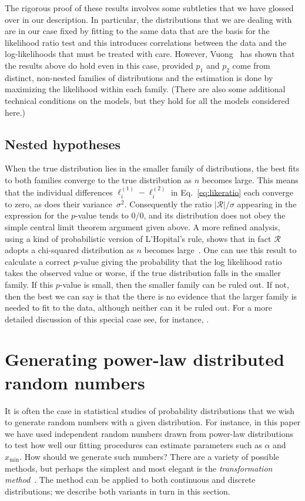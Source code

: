 \documentclass[final]{siamltex}
\newcommand{\defn}{\textit}
\newcommand{\xmin}{\ensuremath{x_{\min}}}
\begin{document}
\begin{appendix}
The rigorous proof of these results involves some subtleties that we have
glossed over in our description.  In particular, the distributions that we
are dealing with are in our case fixed by fitting to the same data that are
the basis for the likelihood ratio test and this introduces correlations
between the data and the log-likelihoods that must be treated with care.
However, Vuong~\cite{Vuong-testing-non-nested-hypotheses} has shown that
the results above do hold even in this case, provided $p_1$ and $p_2$ come
from distinct, non-nested families of distributions and the estimation is
done by maximizing the likelihood within each family.  (There are also some
additional technical conditions on the models, but they hold for all the
models considered here.)


\subsection{Nested hypotheses}
\label{appendix:nested}
When the true distribution lies in the smaller family of distributions, the
best fits to both families converge to the true distribution as $n$ becomes
large.  This means that the individual differences
$\ell_i^{(1)}-\ell_i^{(2)}$ in Eq.~\eqref{eq:likeratio} each converge to
zero, as does their variance~$\sigma^2$.  Consequently the ratio
$|\mathcal{R}|/\sigma$ appearing in the expression for the $p$-value tends
to 0/0, and its distribution does not obey the simple central limit theorem
argument given above.  A more refined analysis, using a kind of
probabilistic version of L'Hopital's rule, shows that in fact $\mathcal{R}$
adopts a chi-squared distribution as $n$ becomes
large~\cite{Wilks-likelihood-ratio}.  One can use this result to calculate
a correct $p$-value giving the probability that the log likelihood ratio
takes the observed value or worse, if the true distribution falls in the
smaller family.  If this $p$-value is small, then the smaller family can be
ruled out.  If not, then the best we can say is that the there is no
evidence that the larger family is needed to fit to the data, although
neither can it be ruled out.  For a more detailed discussion of this
special case see, for instance, \cite{Vuong-testing-non-nested-hypotheses}.



\section{Generating power-law distributed random numbers}
\label{appendix:deviates}
It is often the case in statistical studies of probability distributions
that we wish to generate random numbers with a given distribution.  For
instance, in this paper we have used independent random numbers drawn from
power-law distributions to test how well our fitting procedures can
estimate parameters such as $\alpha$ and~$\xmin$.  How should we generate
such numbers?  There are a variety of possible methods, but perhaps the
simplest and most elegant is the \defn{transformation
 method}~\cite{Numerical-Recipes-in-C}.  The method can be applied to both
continuous and discrete distributions; we describe both variants in turn in
this section.


\end{appendix}
\end{document}

